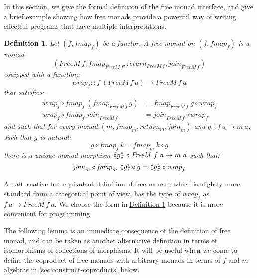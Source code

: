 \documentclass{jfp1}
\newcommand{\fmext}[1]{\langle\kern-0.25em\langle #1 \rangle\kern-0.25em\rangle}
\newtheorem{definition}{Definition}
\newcommand{\defref}[1]{\hyperref[#1]{Definition \ref*{#1}}}
\begin{document}
In this section, we give the formal definition of the free monad
interface, and give a brief example showing how free monads provide a
powerful way of writing effectful programs that have multiple
interpretations.

\begin{definition}\label{defn:freemonad}
  Let $(f, \mathit{fmap}_f)$ be a functor. A \emph{free monad} on
  $(f,\mathit{fmap}_f)$ is a monad
  \begin{displaymath}
    (\mathit{FreeM}~f, \mathit{fmap}_{\mathit{FreeM}~f}, \mathit{return}_{\mathit{FreeM}~f}, \mathit{join}_{\mathit{FreeM}~f})
  \end{displaymath}
  equipped with a function:
  \begin{displaymath}
    \mathit{wrap}_f :: f~(\mathit{FreeM}~f~a) \to \mathit{FreeM}~f~a
  \end{displaymath}
  that satisfies:
  \begin{align}
    \label{eq:wrap-natural}
    \mathit{wrap}_f \circ \mathit{fmap}_f~(\mathit{fmap}_{\mathit{FreeM}~f}~g) &= \mathit{fmap}_{\mathit{FreeM}~f}~g \circ \mathit{wrap}_f \\
    \label{eq:wrap-join}
    \mathit{wrap}_f \circ \mathit{fmap}_f~\mathit{join}_{\mathit{FreeM}~f} &= \mathit{join}_{\mathit{FreeM}~f} \circ \mathit{wrap}_f
  \end{align}
  and such that for every monad $(m, \mathit{fmap}_m,
  \mathit{return_m}, \mathit{join}_m)$ and $g :: f~a \to m~a$, such
  that $g$ is natural:
  \begin{displaymath}
    g \circ \mathit{fmap}_f~k = \mathit{fmap}_m~k \circ g
  \end{displaymath}
  there is a unique monad morphism $\fmext{g} :: \mathit{FreeM}~f~a
  \to m~a$ such that:
  \begin{displaymath}
    \mathit{join}_m \circ \mathit{fmap}_m~\fmext{g} \circ g = \fmext{g} \circ \mathit{wrap}_f
  \end{displaymath}
\end{definition}

An alternative but equivalent definition of free monad, which is
slightly more standard from a categorical point of view, has the type
of $\mathit{wrap}_f$ as $f~a \to \mathit{FreeM}~f~a$. We choose the
form in \defref{defn:freemonad} because it is more convenient for
programming.

The following lemma is an immediate consequence of the definition of
free monad, and can be taken as another alternative definition in
terms of isomorphisms of collections of morphisms. It will be useful
when we come to define the coproduct of free monads with arbitrary
monads in terms of $f$-and-$m$-algebras in
\autoref{sec:construct-coproducts} below.
\end{document}
